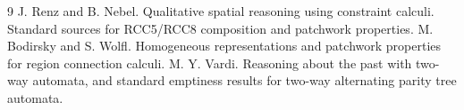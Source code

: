 \documentclass[11pt]{article}
\begin{document}
\begin{thebibliography}{9}
 J. Renz and B. Nebel. Qualitative spatial reasoning using
constraint calculi. Standard sources for RCC5/RCC8 composition and patchwork properties.
 M. Bodirsky and S. Wolfl. Homogeneous representations and
patchwork properties for region connection calculi.
 M. Y. Vardi. Reasoning about the past with two-way automata, and standard
emptiness results for two-way alternating parity tree automata.
\end{thebibliography}
\end{document}

